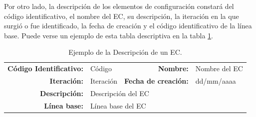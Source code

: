 %

\par Por otro lado, la descripción de los elementos de configuración constará del código identificativo, el nombre del EC, su descripción, la iteración en la que surgió o fue identificado, la fecha de creación y el código identificativo de la línea base. Puede verse un ejemplo de esta tabla descriptiva en la tabla \ref{tab:ECdescription}.

\begin{table}[h]
\begin{center}
\begin{tabular}{ r l | r l }
  \hline
\textbf{Código Identificativo:} & Código & \textbf{Nombre:} & Nombre del EC \\
\textbf{Iteración:} & Iteración & \textbf{Fecha de creación:} & dd/mm/aaaa \\ \hline \hline
\textbf{Descripción:} & \multicolumn{3}{l}{Descripción del EC} \\
\textbf{Línea base:} & \multicolumn{3}{l}{Línea base del EC} \\
\hline
\end{tabular}
\caption{Ejemplo de la Descripción de un EC.}
\label{tab:ECdescription}
\end{center}
\end{table}

